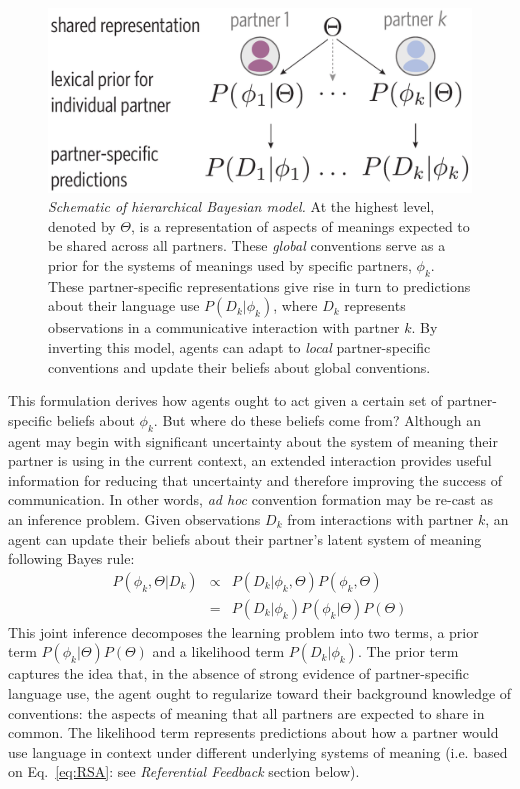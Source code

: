 \begin{figure}[t!]
\includegraphics[scale=0.4]{./figures/task1_model.pdf}
\vspace{.5em}
\caption{\emph{Schematic of hierarchical Bayesian model.} At the highest level, denoted by $\Theta$, is a representation of aspects of meanings expected to be shared across all partners. These \emph{global} conventions serve as a prior for the systems of meanings used by specific partners, $\phi_k$. These partner-specific representations give rise in turn to predictions about their language use $P(D_k|\phi_k)$, where $D_k$ represents observations in a communicative interaction with partner $k$. By inverting this model, agents can adapt to \emph{local} partner-specific conventions and update their beliefs about global conventions.}
\label{fig:model_schematic}
\end{figure}

This formulation derives how agents ought to act given a certain set of partner-specific beliefs about $\phi_k$.
But where do these beliefs come from?
Although an agent may begin with significant uncertainty about the system of meaning their partner is using in the current context, an extended interaction provides useful information for reducing that uncertainty and therefore improving the success of communication.
In other words, \emph{ad hoc} convention formation may be re-cast as an inference problem.
Given observations $D_k$ from interactions with partner $k$, an agent can update their beliefs about their partner's latent system of meaning following Bayes rule:
\begin{equation}
\begin{array}{rcl}
\label{eq:joint_inference}
P(\phi_k, \Theta | D_k)  & \propto &  P(D_k | \phi_k, \Theta) P(\phi_k, \Theta) \\
                           & =   & P(D_k | \phi_k) P(\phi_k | \Theta) P(\Theta)
\end{array}
\end{equation}
This joint inference decomposes the learning problem into two terms, a prior term $P(\phi_k | \Theta)P(\Theta)$ and a likelihood term $P(D_k | \phi_k)$.
The prior term captures the idea that, in the absence of strong evidence of partner-specific language use, the agent ought to regularize toward their background knowledge of conventions: the aspects of meaning that all partners are expected to share in common.
The likelihood term represents predictions about how a partner would use language in context under different underlying systems of meaning (i.e. based on Eq.~\ref{eq:RSA}: see \emph{Referential Feedback} section below).

